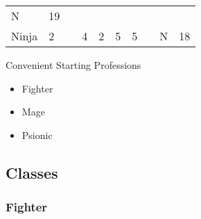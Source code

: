 \documentclass[12pt]{article}
\begin{document}
\begin{longtable}[]{@{}llllllllll@{}}
\begin{minipage}[t]{0.07\columnwidth}
N
\strut\end{minipage} &
\begin{minipage}[t]{0.08\columnwidth}\raggedright\strut
19
\strut\end{minipage}\tabularnewline
\begin{minipage}[t]{0.13\columnwidth}\raggedright\strut
Ninja
\strut\end{minipage} &
\begin{minipage}[t]{0.06\columnwidth}\raggedright\strut
2
\strut\end{minipage} &
\begin{minipage}[t]{0.06\columnwidth}\raggedright\strut
\strut\end{minipage} &
\begin{minipage}[t]{0.06\columnwidth}\raggedright\strut
4
\strut\end{minipage} &
\begin{minipage}[t]{0.06\columnwidth}\raggedright\strut
2
\strut\end{minipage} &
\begin{minipage}[t]{0.06\columnwidth}\raggedright\strut
5
\strut\end{minipage} &
\begin{minipage}[t]{0.06\columnwidth}\raggedright\strut
5
\strut\end{minipage} &
\begin{minipage}[t]{0.06\columnwidth}\raggedright\strut
\strut\end{minipage} &
\begin{minipage}[t]{0.07\columnwidth}\raggedright\strut
N
\strut\end{minipage} &
\begin{minipage}[t]{0.08\columnwidth}\raggedright\strut
18
\strut\end{minipage}\tabularnewline
\bottomrule
\end{longtable}

Convenient Starting Professions

\begin{itemize}
\item
  Fighter
\item
  Mage
\item
  Psionic
\end{itemize}

\subsection{Classes}\label{classes}

\subsubsection{Fighter}\label{fighter}
\end{document}
